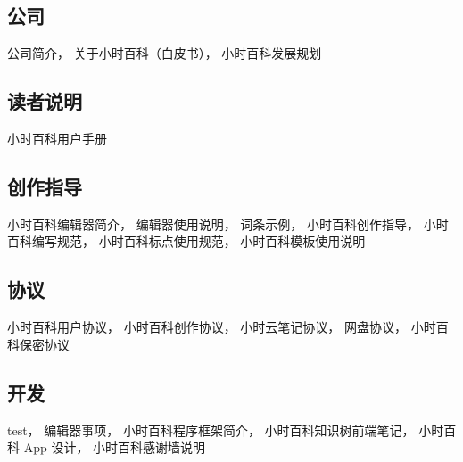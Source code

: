 
\subsection{公司}
公司简介，
关于小时百科（白皮书），
小时百科发展规划

\subsection{读者说明}
小时百科用户手册

\subsection{创作指导}
小时百科编辑器简介，
编辑器使用说明，
词条示例，
小时百科创作指导，
小时百科编写规范，
小时百科标点使用规范，
小时百科模板使用说明

\subsection{协议}
小时百科用户协议，
小时百科创作协议，
小时云笔记协议，
网盘协议，
小时百科保密协议

\subsection{开发}
test，
编辑器事项，
小时百科程序框架简介，
小时百科知识树前端笔记，
小时百科 App 设计，
小时百科感谢墙说明
